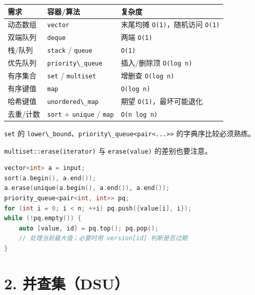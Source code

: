 \begin{longtable}[]{@{}lll@{}}
\toprule\noalign{}
需求 & 容器/算法 & 复杂度 \\
\midrule\noalign{}
\endhead
\bottomrule\noalign{}
\endlastfoot
动态数组 & \passthrough{\lstinline!vector!} & 末尾均摊 \passthrough{\lstinline!O(1)!}，随机访问 \passthrough{\lstinline!O(1)!} \\
双端队列 & \passthrough{\lstinline!deque!} & 两端 \passthrough{\lstinline!O(1)!} \\
栈/队列 & \passthrough{\lstinline!stack!} / \passthrough{\lstinline!queue!} & \passthrough{\lstinline!O(1)!} \\
优先队列 & \passthrough{\lstinline!priority\_queue!} & 插入/删除顶 \passthrough{\lstinline!O(log n)!} \\
有序集合 & \passthrough{\lstinline!set!} / \passthrough{\lstinline!multiset!} & 增删查 \passthrough{\lstinline!O(log n)!} \\
有序键值 & \passthrough{\lstinline!map!} & \passthrough{\lstinline!O(log n)!} \\
哈希键值 & \passthrough{\lstinline!unordered\_map!} & 期望 \passthrough{\lstinline!O(1)!}，最坏可能退化 \\
去重/计数 & \passthrough{\lstinline!sort!} + \passthrough{\lstinline!unique!} / \passthrough{\lstinline!map!} & \passthrough{\lstinline!O(n log n)!} \\
\end{longtable}

\passthrough{\lstinline!set!} 的 \passthrough{\lstinline!lower\_bound!}、\passthrough{\lstinline!priority\_queue<pair<...>>!} 的字典序比较必须熟练。

\passthrough{\lstinline!multiset::erase(iterator)!} 与 \passthrough{\lstinline!erase(value)!} 的差别也要注意。

\begin{lstlisting}[language={C++}]
vector<int> a = input;
sort(a.begin(), a.end());
a.erase(unique(a.begin(), a.end()), a.end());
priority_queue<pair<int, int>> pq;
for (int i = 0; i < n; ++i) pq.push({value[i], i});
while (!pq.empty()) {
    auto [value, id] = pq.top(); pq.pop();
    // 处理当前最大值；必要时用 version[id] 判断是否过期
}
\end{lstlisting}

\section{2. 并查集（DSU）}\label{ux5e76ux67e5ux96c6dsu}

